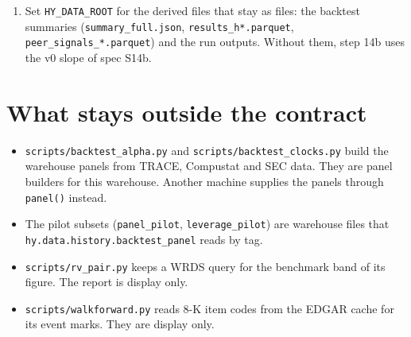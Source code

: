 \documentclass[11pt,a4paper]{article}
\newcommand{\code}[1]{\texttt{\small #1}}
\begin{document}
\begin{enumerate}
\begin{itemize}
  \item Run the suite: \code{python3 -m pytest -q}.
  \item Take a golden snapshot on the new machine (\code{scripts/golden\_check.py snapshot}), then run \code{check}
    after each change. The numbers will differ from this machine's numbers because the data differs. They must not
    move between your own runs.
  \end{itemize}
\item Set \code{HY\_DATA\_ROOT} for the derived files that stay as files: the backtest summaries
  (\code{summary\_full.json}, \code{results\_h*.parquet}, \code{peer\_signals\_*.parquet}) and the run outputs. Without
  them, step 14b uses the v0 slope of spec S14b.
\end{enumerate}

\section{What stays outside the contract}
\begin{itemize}
\item \code{scripts/backtest\_alpha.py} and \code{scripts/backtest\_clocks.py} build the warehouse panels from TRACE,
  Compustat and SEC data. They are panel builders for this warehouse. Another machine supplies the panels through
  \code{panel()} instead.
\item The pilot subsets (\code{panel\_pilot}, \code{leverage\_pilot}) are warehouse files that
  \code{hy.data.history.backtest\_panel} reads by tag.
\item \code{scripts/rv\_pair.py} keeps a WRDS query for the benchmark band of its figure. The report is display only.
\item \code{scripts/walkforward.py} reads 8-K item codes from the EDGAR cache for its event marks. They are display
  only.
\end{itemize}
\end{document}

